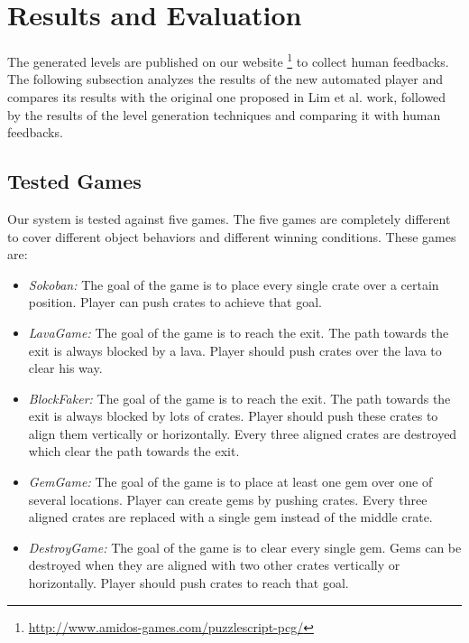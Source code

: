 \documentclass[letterpaper]{article}
\begin{document}
\section{Results and Evaluation}
The generated levels are published on our website \footnote{\url{http://www.amidos-games.com/puzzlescript-pcg/}} to collect human feedbacks. The following subsection analyzes the results of the new automated player and compares its results with the original one proposed in Lim et al. work\cite{puzzleScriptGeneration}, followed by the results of the level generation techniques and comparing it with human feedbacks.

\subsection{Tested Games}
Our system is tested against five games. The five games are completely different to cover different object behaviors and different winning conditions. These games are:
\begin{itemize} \itemsep0pt \parskip0pt 
	\item \emph{Sokoban:} The goal of the game is to place every single crate over a certain position. Player can push crates to achieve that goal.
	\item \emph{LavaGame:} The goal of the game is to reach the exit. The path towards the exit is always blocked by a lava. Player should push crates over the lava to clear his way.
	\item \emph{BlockFaker:} The goal of the game is to reach the exit. The path towards the exit is always blocked by lots of crates. Player should push these crates to align them vertically or horizontally. Every three aligned crates are destroyed which clear the path towards the exit.
	\item \emph{GemGame:} The goal of the game is to place at least one gem over one of several locations. Player can create gems by pushing crates. Every three aligned crates are replaced with a single gem instead of the middle crate.
	\item \emph{DestroyGame:} The goal of the game is to clear every single gem. Gems can be destroyed when they are aligned with two other crates vertically or horizontally. Player should push crates to reach that goal.
\end{itemize}
\end{document}
